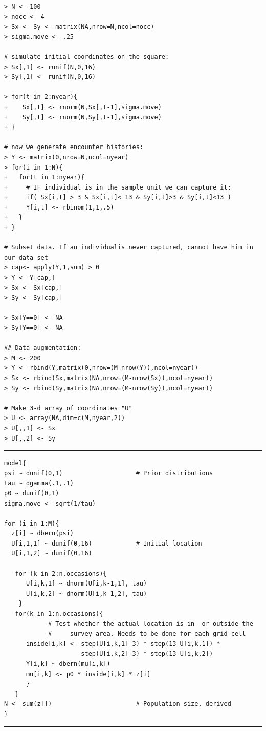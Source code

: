 {\small
\begin{verbatim}
> N <- 100
> nocc <- 4
> Sx <- Sy <- matrix(NA,nrow=N,ncol=nocc)
> sigma.move <- .25

# simulate initial coordinates on the square:
> Sx[,1] <- runif(N,0,16)
> Sy[,1] <- runif(N,0,16)

> for(t in 2:nyear){
+    Sx[,t] <- rnorm(N,Sx[,t-1],sigma.move)
+    Sy[,t] <- rnorm(N,Sy[,t-1],sigma.move)
+ }

# now we generate encounter histories:
> Y <- matrix(0,nrow=N,ncol=nyear)
> for(i in 1:N){
+   for(t in 1:nyear){
+     # IF individual is in the sample unit we can capture it:
+     if( Sx[i,t] > 3 & Sx[i,t]< 13 & Sy[i,t]>3 & Sy[i,t]<13 )
+     Y[i,t] <- rbinom(1,1,.5)
+   }
+ }

# Subset data. If an individualis never captured, cannot have him in our data set
> cap<- apply(Y,1,sum) > 0
> Y <- Y[cap,]
> Sx <- Sx[cap,]
> Sy <- Sy[cap,]

> Sx[Y==0] <- NA
> Sy[Y==0] <- NA

## Data augmentation:
> M <- 200
> Y <- rbind(Y,matrix(0,nrow=(M-nrow(Y)),ncol=nyear))
> Sx <- rbind(Sx,matrix(NA,nrow=(M-nrow(Sx)),ncol=nyear))
> Sy <- rbind(Sy,matrix(NA,nrow=(M-nrow(Sy)),ncol=nyear))

# Make 3-d array of coordinates "U" 
> U <- array(NA,dim=c(M,nyear,2))
> U[,,1] <- Sx
> U[,,2] <- Sy
\end{verbatim}
}

\begin{panel}[htp]
\centering
\rule[0.15in]{\textwidth}{.03in}
{\small
\begin{verbatim}
model{
psi ~ dunif(0,1)                    # Prior distributions
tau ~ dgamma(.1,.1)
p0 ~ dunif(0,1)
sigma.move <- sqrt(1/tau)

for (i in 1:M){
  z[i] ~ dbern(psi)
  U[i,1,1] ~ dunif(0,16)            # Initial location
  U[i,1,2] ~ dunif(0,16)

   for (k in 2:n.occasions){
      U[i,k,1] ~ dnorm(U[i,k-1,1], tau)
      U[i,k,2] ~ dnorm(U[i,k-1,2], tau)
    }
   for(k in 1:n.occasions){
            # Test whether the actual location is in- or outside the
            #     survey area. Needs to be done for each grid cell
      inside[i,k] <- step(U[i,k,1]-3) * step(13-U[i,k,1]) *
                     step(U[i,k,2]-3) * step(13-U[i,k,2])
      Y[i,k] ~ dbern(mu[i,k])
      mu[i,k] <- p0 * inside[i,k] * z[i]
      } 
   } 
N <- sum(z[])                       # Population size, derived
}
\end{verbatim}
}
\rule[-0.15in]{\textwidth}{.03in}
\caption{
{\bf BUGS} model specification for the search-encounter model similar
to Royle and Young (2008) but with a random walk movement model.
help file \mbox{\tt ?uniform$\_$search} in the {\bf R} package \mbox{\tt scrbook}.
}
\label{search-encounter.panel.uniform}
\end{panel}

